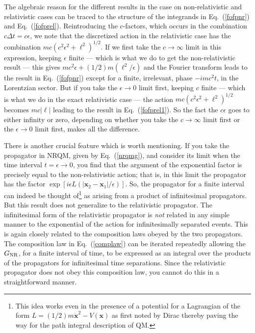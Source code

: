 \documentclass[12pt]{article}
\def\eq#1{{Eq.~(\ref{#1})}}
\begin{document}
The algebraic reason for the different results in the case on non-relativistic and relativistic cases can be traced to the structure of the integrands in \eq{fofpnr} and \eq{fofprel}. Reintroducing the $c$-factors, which occurs in the combination $c\Delta t=c\epsilon$, we note that the discretized action in the relativistic case has the combination $mc(c^2\epsilon^2 +\bm{\ell}^2)^{1/2}$. If we first take the $c\to\infty$ limit in this expression, keeping  $\epsilon$ finite --- which is what we do to get the non-relativistic result --- this gives $mc^2\epsilon+(1/2)m(\bm{\ell}^2/\epsilon)$ and the Fourier transform leads to the result in \eq{fofpnr} except for a finite, irrelevant, phase $-imc^2t$, in the Lorentzian sector. But if you take the $\epsilon\to0$ limit first, keeping $c$ finite ---  which is what we do in the exact relativistic case ---  the action $mc(c^2\epsilon^2 +\bm{\ell}^2)^{1/2}$ becomes 
$mc|\bm{\ell}|$ leading to the result in \eq{fofprel1}. So the fact the $c\epsilon$ goes to either infinity or zero, depending on whether you take the $c\to\infty$ limit first or the $\epsilon\to0$ limit first, makes all the difference.

There is another crucial feature which is worth mentioning. If you take the propagator in NRQM, given by \eq{nrqmg},  and consider its limit when the time interval $t = \epsilon \to 0$, you find that the argument of the  exponential factor is precisely equal to the non-relativistic action; that is, in this limit the propagator has the factor $\exp[i\epsilon L(|\bm{x}_2 - \bm{x}_1|/\epsilon)]  $. So, the propagator for a finite interval can indeed be thought of\footnote{This idea works even in the presence of a potential for a Lagrangian of the form $L = (1/2)m\dot{\bm{x}}^2 - V(\bm{x})$ as first noted by Dirac thereby paving the way for the path integral description of QM.} as arising from a product of infinitesimal propagators. But this result does not generalize to the relativistic propagator. The infinitesimal form of the relativistic propagator is \textit{not} related in any simple manner to the exponential of the action for infinitesimally separated events. This is again closely related to the composition laws obeyed by the two propagators. The composition law in \eq{complaw} can be iterated repeatedly allowing the $G_{\rm NR}$, for a finite interval of time, to be expressed as an integral over the products of the propagators for infinitesimal time separations.  Since the relativistic propagator does not obey this composition law, you cannot do this in a straightforward manner. 
\end{document}
